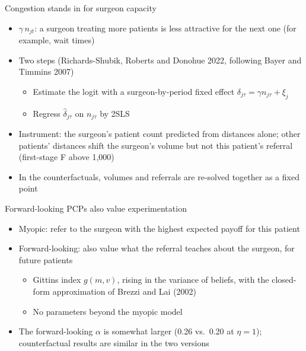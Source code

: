 \documentclass[aspectratio=169,11pt]{beamer}
\begin{document}
\begin{frame}[noframenumbering,label=bk-congestion]{Congestion stands in for surgeon capacity}
  \begin{itemize}\setlength{\itemsep}{8pt}
    \item $\gamma\, n_{jt}$: a surgeon treating more patients is less attractive for the next one (for example, wait times)
    \item Two steps (Richards-Shubik, Roberts and Donohue 2022, following Bayer and Timmins 2007)
      \begin{itemize}
        \item Estimate the logit with a surgeon-by-period fixed effect $\delta_{j\tau} = \gamma n_{j\tau} + \xi_j$
        \item Regress $\hat\delta_{j\tau}$ on $n_{j\tau}$ by 2SLS
      \end{itemize}
    \item Instrument: the surgeon's patient count predicted from distances alone; other patients' distances shift the surgeon's volume but not this patient's referral (first-stage F above 1,000)
    \item In the counterfactuals, volumes and referrals are re-solved together as a fixed point
  \end{itemize}
\end{frame}

\begin{frame}[noframenumbering,label=bk-fwd]{Forward-looking PCPs also value experimentation}
  \begin{itemize}\setlength{\itemsep}{8pt}
    \item Myopic: refer to the surgeon with the highest expected payoff for this patient
    \item Forward-looking: also value what the referral teaches about the surgeon, for future patients
      \begin{itemize}
        \item Gittins index $g(m, v)$, rising in the variance of beliefs, with the closed-form approximation of Brezzi and Lai (2002)
        \item No parameters beyond the myopic model
      \end{itemize}
    \item The forward-looking $\alpha$ is somewhat larger (0.26 vs.\ 0.20 at $\eta = 1$); counterfactual results are similar in the two versions
  \end{itemize}
\end{frame}
\end{document}
